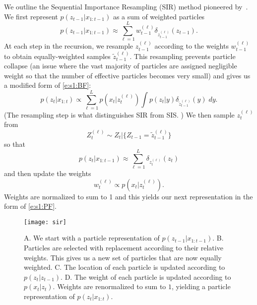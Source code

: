 We outline the Sequential Importance Resampling (SIR) method pioneered by~\cite{Gor93}.   We first represent $p(z_{t-1}|x_{1:t-1})$ as a sum of weighted particles
\begin{equation}
p(z_{t-1}|x_{1:t-1}) \approx \sum_{\ell=1}^L w_{t-1}^{(\ell)} \delta_{z_{t-1}^{(\ell)}}(z_{t-1}). \label{e:s1:PF}
\end{equation}
At each step in the recursion, we resample $z_{t-1}^{(\ell)}$ according to the weights $w_{t-1}^{(\ell)}$ to obtain equally-weighted samples $\tilde z_{t-1}^{(\ell)}$.  This resampling prevents particle collapse (an issue where the vast majority of particles are assigned negligible weight so that the number of effective particles becomes very small)  and gives us a modified form of \eqref{e:s1:BF}:
\begin{equation}
p(z_t|x_{1:t}) \propto   \sum_{\ell=1}^L p(x_t|z_t^{(\ell)}) \int p(z_t|y)   \delta_{\tilde z_{t-1}^{(\ell)}}(y) \; dy.
\end{equation}
(The resampling step is what distinguishes SIR from SIS. ) We then sample $z_t^{(\ell)}$ from
\begin{equation} \label{e:s1:PF_loci}
Z_{t}^{(\ell)} \sim Z_t|\{Z_{t-1}=\tilde z_{t-1}^{(\ell)}\}
\end{equation}
so that
\begin{equation*}
p(z_t|x_{1:t-1}) \approx \sum_{\ell=1}^L  \delta_{z_t^{(\ell)}}(z_t)
\end{equation*}
and then update the weights
\begin{equation} \label{e:s1:PF_weights}
w_t^{(\ell)} \propto p(x_t|z_{t}^{(\ell)}).
\end{equation}
Weights are normalized to sum to 1 and this yields our next representation in the form of \eqref{e:s1:PF}.

\begin{figure}[h]
\begin{minipage}[c]{.49\textwidth}
\caption[Sequential Importance Resampling]{A. We start with a particle representation of $p(z_{t-1}|x_{1:t-1})$.  B. Particles are selected with replacement according to their relative weights.  This gives us a new set of particles that are now equally weighted.  C. The location of each particle is updated according to $p(z_t|z_{t-1})$.  D. The weight of each particle is updated according to $p(x_t|z_t)$.  Weights are renormalized to sum to $1$, yielding a particle representation of $p(z_t|x_{1:t})$.}
\end{minipage}
\hfill
\begin{minipage}[c]{.49\textwidth}
\texttt{[image: sir]}
\end{minipage}
\end{figure}

